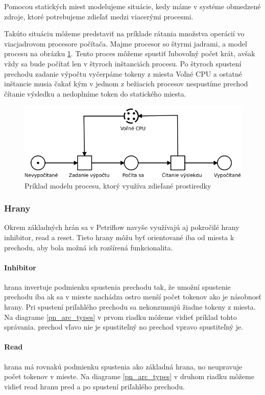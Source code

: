 Pomocou statických miest modelujeme situácie, kedy máme v systéme obmedzené zdroje, ktoré potrebujeme zdieľať medzi viacerými procesmi. 

Takúto situáciu môžeme predstaviť na príklade rátania množstva operácií vo viacjadrovom procesore počítača. Majme procesor so štyrmi jadrami, a model procesu na obrázku \ref{pn_static_place}. Tento proces môžeme spustiť ľubovoľný počet krát, avšak vždy sa bude počítať len v štyroch inštanciách procesu. Po štyroch spustení prechodu zadanie výpočtu vyčerpáme tokeny z miesta Voľné CPU a ostatné inštancie musia čakať kým v jednom z bežiacich procesov nespustíme prechod čítanie výsledku a nedoplníme token do statického miesta. 


\begin{figure}[!htbp]
\centering
\includegraphics[width=14cm]{img/pn_static_place.png}
\caption{Príklad modelu procesu, ktorý využíva zdieľané prostiredky}
\label{pn_static_place}
\end{figure}


\subsubsection{Hrany}
Okrem základných hrán sa v Petriflow navyše využívajú aj pokročilé hrany inhibitor, read a reset. Tieto hrany môžu byť orientované iba od miesta k prechodu, aby bola možná ich rozšírená funkcionalita.

\paragraph{Inhibitor} hrana invertuje  podmienku spustenia prechodu tak, že umožní spustenie prechodu iba ak sa v mieste nachádza ostro menší počet tokenov ako je násobnosť hrany. Pri spustení priľahlého prechodu sa nekonzumujú žiadne tokeny z miesta. Na diagrame  \ref{pn_arc_types} v prvom riadku môžeme vidieť príklad tohto správania. prechod vľavo nie je spustiteľný no prechod vpravo spustiteľný je. 

\paragraph{Read} hrana má rovnakú podmienku spustenia ako základná hrana, no neupravuje počet tokenov v mieste. Na diagrame  \ref{pn_arc_types} v druhom riadku môžeme vidieť read hranu pred a po spustení priľahlého prechodu. 
 
